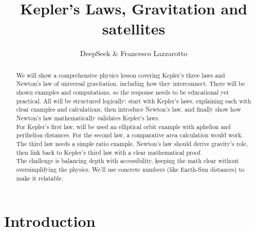 \documentclass[a4paper,10pt]{article}
\title{Kepler's Laws, Gravitation and satellites}
\author{DeepSeek \& Francesco Lazzarotto}
\begin{document}
\maketitle

\begin{abstract}
We will show a comprehensive physics lesson covering Kepler's three laws and Newton's law of universal gravitation, including how they interconnect. There will be shown examples and computations, so the response needs to be educational yet practical.
All will be structured logically: start with Kepler's laws, explaining each with clear examples and calculations, then introduce Newton's law, and finally show how Newton's law mathematically validates Kepler's laws.\\
For Kepler's first law, will be used an elliptical orbit example with aphelion and perihelion distances. For the second law, a comparative area calculation would work. The third law needs a simple ratio example. Newton's law should derive gravity's role, then link back to Kepler's third law with a clear mathematical proof.\\
The challenge is balancing depth with accessibility, keeping the math clear without oversimplifying the physics. We'll use concrete numbers (like Earth-Sun distances) to make it relatable.
\end{abstract}
\clearpage
\tableofcontents
\clearpage
\section{Introduction}
\end{document}
